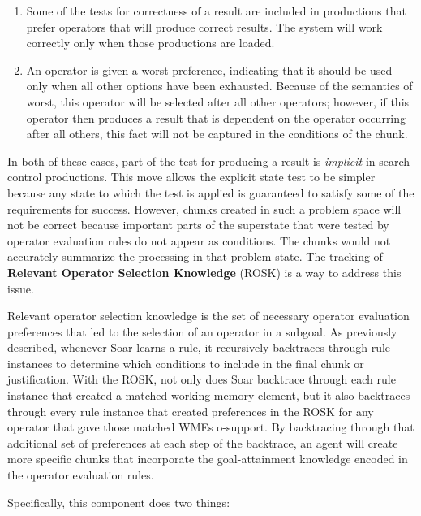 \begin{enumerate}
	\item Some of the tests for correctness of a result are included in productions that prefer operators that will produce correct results. The system will work correctly only when those productions are loaded.

	\item An operator is given a worst preference, indicating that it should be used only when all other options have been exhausted. Because of the semantics of worst, this operator will be selected after all other operators; however, if this operator then produces a result that is dependent on the operator occurring after all others, this fact will not be captured in the conditions of the chunk.
\end{enumerate}

In both of these cases, part of the test for producing a result is \emph{implicit} in search control productions. This move allows the explicit state test to be simpler because any state to which the test is applied is guaranteed to satisfy some of the requirements for success. However, chunks created in such a problem space will not be correct because important parts of the superstate that were tested by operator evaluation rules do not appear as conditions. The chunks would not accurately summarize the processing in that problem state.  The tracking of \textbf{Relevant Operator Selection Knowledge} (ROSK) is a way to address this issue.

Relevant operator selection knowledge is the set of necessary operator evaluation preferences that led to the selection of an operator in a subgoal.  As previously described, whenever Soar learns a rule, it recursively backtraces through rule instances to determine which conditions to include in the final chunk or justification. With the ROSK, not only does Soar backtrace through each rule instance that created a matched working memory element, but it also backtraces through every rule instance that created preferences in the ROSK for any operator that gave those matched WMEs o-support. By backtracing through that additional set of preferences at each step of the backtrace, an agent will create more specific chunks that incorporate the goal-attainment knowledge encoded in the operator evaluation rules.

Specifically, this component does two things:

